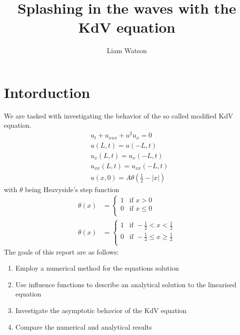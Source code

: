 \documentclass{article}
\title{Splashing in the waves with the KdV equation}
\author{Liam Watson}
\begin{document}
\maketitle

\section{Intorduction}
We are tasked with investigating the behavior of the so called modified KdV equation.
\begin{align}
&u_t + u_{xxx} + u^2u_x = 0 \\
&u(L,t) = u(-L,t) \\
&u_x(L,t) = u_x(-L,t) \\
&u_{xx}(L,t) = u_{xx}(-L,t) \\
&u(x,0) = A \theta(\frac{1}{2}- |x|) 
\end{align}
with $\theta$ being Heavyside’s step function
\begin{align*}
\theta(x) &=
\begin{cases}
 1 & \text{if } x > 0 \\
 0 & \text{if } x \leq 0 \\
\end{cases}
\\
\theta(x) &=
\begin{cases}
 1 & \text{if } -\frac{1}{2} < x < \frac{1}{2} \\
 0 & \text{if } -\frac{1}{2} \leq x \geq \frac{1}{2}\\
\end{cases}
\end{align*}
The goals of this report are as follows:
\begin{enumerate}
\item Employ a numerical method for the equations solution 
\item Use influence functions to describe an analytical solution to the linearised equation
\item Investigate the asymptotic behavior of the KdV equation 
\item Compare the numerical and analytical results
\end{enumerate}
\end{document}
